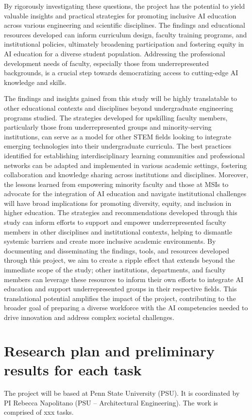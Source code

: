 \documentclass[11pt]{article}
\begin{document}
By rigorously investigating these questions, the project has the potential to yield valuable insights and practical strategies for promoting inclusive AI education across various engineering and scientific disciplines. The findings and educational resources developed can inform curriculum design, faculty training programs, and institutional policies, ultimately broadening participation and fostering equity in AI education for a diverse student population. Addressing the professional development needs of faculty, especially those from underrepresented backgrounds, is a crucial step towards democratizing access to cutting-edge AI knowledge and skills. 

The findings and insights gained from this study will be highly translatable to other educational contexts and disciplines beyond undergraduate engineering programs studied. The strategies developed for upskilling faculty members, particularly those from underrepresented groups and minority-serving institutions, can serve as a model for other STEM fields looking to integrate emerging technologies into their undergraduate curricula. The best practices identified for establishing interdisciplinary learning communities and professional networks can be adapted and implemented in various academic settings, fostering collaboration and knowledge sharing across institutions and disciplines.
Moreover, the lessons learned from empowering minority faculty and those at MSIs to advocate for the integration of AI education and navigate institutional challenges will have broad implications for promoting diversity, equity, and inclusion in higher education. The strategies and recommendations developed through this study can inform efforts to support and empower underrepresented faculty members in other disciplines and institutional contexts, helping to dismantle systemic barriers and create more inclusive academic environments.
By documenting and disseminating the findings, tools, and resources developed through this project, we aim to create a ripple effect that extends beyond the immediate scope of the study;  other institutions, departments, and faculty members can leverage these resources to inform their own efforts to integrate AI education and support underrepresented groups in their respective fields. This translational potential amplifies the impact of the project, contributing to the broader goal of preparing a diverse workforce with the AI competencies needed to drive innovation and address complex societal challenges.


\section{Research plan and preliminary results for each task} The project will be based at Penn State University (PSU). It is coordinated by PI Rebecca Napolitano (PSU – Architectural Engineering). The work is comprised of xxx tasks.
\end{document}
